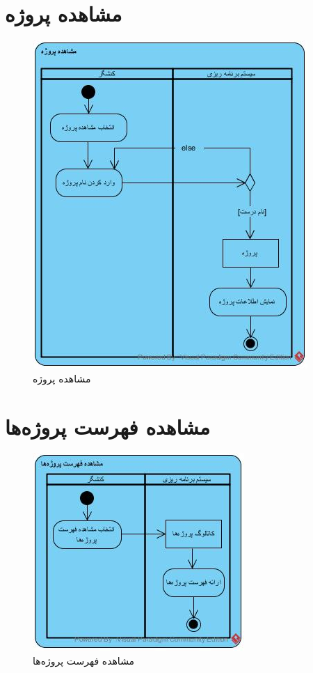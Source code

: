\section{مشاهده پروژه}
\begin{figure}[H]
	\centering
	\includegraphics[scale=1]{img/activity/ViewProject}
	\caption{مشاهده پروژه}
\end{figure}


\section{مشاهده فهرست پروژه‌ها}
\begin{figure}[H]
	\centering
	\includegraphics[scale=1]{img/activity/ViewListOfProjects}
	\caption{مشاهده فهرست پروژه‌ها}
\end{figure}



